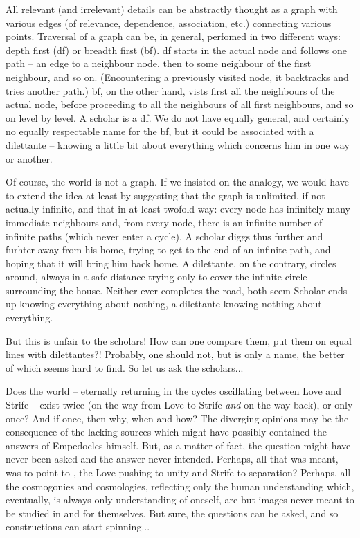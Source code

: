 
All relevant (and irrelevant) details can be abstractly thought as a graph with
various edges (of relevance, dependence, association, etc.) connecting various points.
Traversal of a graph can be, in general, perfomed in two different ways: depth
first ({\sc df}) or breadth first ({\sc bf}). {\sc df} starts in the actual node
and follows one path -- an edge to a neighbour node, then to some neighbour of
the first neighbour, and so on. (Encountering a previously visited node, it
backtracks and tries another path.) {\sc bf}, on the other hand, vists first all the
neighbours of the actual node, before proceeding to all the neighbours of all
first neighbours, and so on level by level. 
A scholar is a {\sc df}. We do not have equally general, and certainly no
equally respectable name for the {\sc bf}, but it could be associated with a
dilettante -- knowing a little bit about everything which concerns him in one
way or another.

Of course, the world is not a graph. If we insisted on the analogy, we would have to
extend the idea at least by suggesting that the graph is unlimited, if
not actually infinite, and that in at least twofold way: every node has
infinitely many immediate neighbours and, from every node, there is an infinite
number of infinite paths (which never enter a cycle). A scholar diggs thus
further and furhter away from his home, trying to get to the end of an infinite
path, and hoping that it will bring him back home. A dilettante, on the
contrary, circles around, always in a safe distance
trying only to cover the infinite circle 
surrounding the house. Neither ever completes the road, both seem  Scholar
ends up knowing everything about nothing, a 
dilettante knowing nothing about everything.

But this is unfair to the scholars! How can one compare them, put them on equal
lines with dilettantes?! Probably, one should not, but  is only a
name, the better of which seems hard to find. So let us ask the scholars...

Does the world -- eternally returning in the cycles oscillating between Love and
Strife -- exist twice (on the way from Love to Strife {\em and} on the way
back), or only once? And if once, then why, when and how?
The diverging opinions may be the
consequence of the lacking sources which might have possibly contained the
answers of Empedocles himself. But, as a matter of fact, the question might have
never been asked and the answer never intended. Perhaps, all that was meant, was
to point to , the Love pushing to
unity and Strife to separation?  Perhaps, all the cosmogonies and cosmologies,
reflecting only the human understanding which, eventually, is always only
understanding of oneself, are but images never meant to be studied in and for
themselves. But sure, the questions can be asked, and so constructions can start
spinning...

